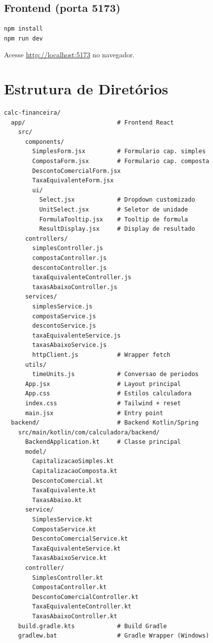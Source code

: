 \documentclass[12pt,a4paper]{article}
\begin{document}
\subsection{Frontend (porta 5173)}

\begin{lstlisting}[language=bash,title={Terminal na pasta app/}]
npm install
npm run dev
\end{lstlisting}

Acesse \url{http://localhost:5173} no navegador.

\section{Estrutura de Diretórios}

\begin{lstlisting}[title={Árvore do projeto}]
calc-financeira/
  app/                          # Frontend React
    src/
      components/
        SimplesForm.jsx         # Formulario cap. simples
        CompostaForm.jsx        # Formulario cap. composta
        DescontoComercialForm.jsx
        TaxaEquivalenteForm.jsx
        ui/
          Select.jsx            # Dropdown customizado
          UnitSelect.jsx        # Seletor de unidade
          FormulaTooltip.jsx    # Tooltip de formula
          ResultDisplay.jsx     # Display de resultado
      controllers/
        simplesController.js
        compostaController.js
        descontoController.js
        taxaEquivalenteController.js
        taxasAbaixoController.js
      services/
        simplesService.js
        compostaService.js
        descontoService.js
        taxaEquivalenteService.js
        taxasAbaixoService.js
        httpClient.js           # Wrapper fetch
      utils/
        timeUnits.js            # Conversao de periodos
      App.jsx                   # Layout principal
      App.css                   # Estilos calculadora
      index.css                 # Tailwind + reset
      main.jsx                  # Entry point
  backend/                      # Backend Kotlin/Spring
    src/main/kotlin/com/calculadora/backend/
      BackendApplication.kt     # Classe principal
      model/
        CapitalizacaoSimples.kt
        CapitalizacaoComposta.kt
        DescontoComercial.kt
        TaxaEquivalente.kt
        TaxasAbaixo.kt
      service/
        SimplesService.kt
        CompostaService.kt
        DescontoComercialService.kt
        TaxaEquivalenteService.kt
        TaxasAbaixoService.kt
      controller/
        SimplesController.kt
        CompostaController.kt
        DescontoComercialController.kt
        TaxaEquivalenteController.kt
        TaxasAbaixoController.kt
    build.gradle.kts            # Build Gradle
    gradlew.bat                 # Gradle Wrapper (Windows)
\end{lstlisting}
\end{document}
